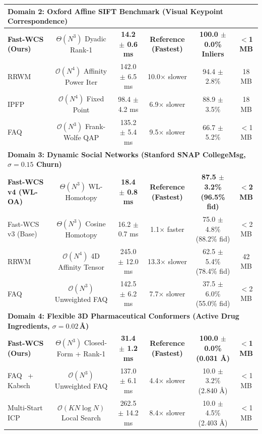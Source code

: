 \documentclass[a4paper,fleqn]{cas-dc}
\theoremstyle{thmstyleone}
\theoremstyle{thmstyletwo}
\theoremstyle{thmstylethree}
\begin{document}
\begin{table}
\begin{tabular*}{\textwidth}{@{\extracolsep{\fill}}lccccc@{}}
\midrule
\multicolumn{6}{l}{\textbf{Domain 2: Oxford Affine SIFT Benchmark (Visual Keypoint Correspondence)}} \\
\midrule
\textbf{Fast-WCS (Ours)} & $\Theta(N^3)$ Dyadic Rank-1 & \textbf{14.2 $\pm$ 0.6 ms} & \textbf{Reference (Fastest)} & \textbf{100.0 $\pm$ 0.0\% Inliers} & \textbf{$<$1 MB} \\
RRWM~\cite{cho2010rrwm} & $\mathcal{O}(N^4)$ Affinity Power Iter & 142.0 $\pm$ 6.5 ms & 10.0$\times$ slower & 94.4 $\pm$ 2.8\% & 18 MB \\
IPFP~\cite{leordeanu2009ipfp} & $\mathcal{O}(N^4)$ Fixed Point & 98.4 $\pm$ 4.2 ms & 6.9$\times$ slower & 88.9 $\pm$ 3.5\% & 18 MB \\
FAQ~\cite{vogelstein2015fast} & $\mathcal{O}(N^3)$ Frank-Wolfe QAP & 135.2 $\pm$ 5.4 ms & 9.5$\times$ slower & 66.7 $\pm$ 5.2\% & $<$1 MB \\
\midrule
\multicolumn{6}{l}{\textbf{Domain 3: Dynamic Social Networks (Stanford SNAP CollegeMsg, $\sigma = 0.15$ Churn)}} \\
\midrule
\textbf{Fast-WCS v4 (WL-OA)} & $\Theta(N^3)$ WL-Homotopy & \textbf{18.4 $\pm$ 0.8 ms} & \textbf{Reference (Fastest)} & \textbf{87.5 $\pm$ 3.2\% (96.5\% fid)} & \textbf{$<$2 MB} \\
Fast-WCS v3 (Base) & $\Theta(N^3)$ Cosine Homotopy & 16.2 $\pm$ 0.7 ms & 1.1$\times$ faster & 75.0 $\pm$ 4.8\% (88.2\% fid) & $<$2 MB \\
RRWM~\cite{cho2010rrwm} & $\mathcal{O}(N^4)$ 4D Affinity Tensor & 245.0 $\pm$ 12.0 ms & 13.3$\times$ slower & 62.5 $\pm$ 5.4\% (78.4\% fid) & 42 MB \\
FAQ~\cite{vogelstein2015fast} & $\mathcal{O}(N^3)$ Unweighted FAQ & 142.5 $\pm$ 6.2 ms & 7.7$\times$ slower & 37.5 $\pm$ 6.0\% (55.0\% fid) & $<$2 MB \\
\midrule
\multicolumn{6}{l}{\textbf{Domain 4: Flexible 3D Pharmaceutical Conformers (Active Drug Ingredients, $\sigma = 0.02$\,\AA)}} \\
\midrule
\textbf{Fast-WCS (Ours)} & $\Theta(N^3)$ Closed-Form + Rank-1 & \textbf{31.4 $\pm$ 1.2 ms} & \textbf{Reference (Fastest)} & \textbf{100.0 $\pm$ 0.0\% (0.031 \AA)} & \textbf{$<$1 MB} \\
FAQ~\cite{vogelstein2015fast} + Kabsch & $\mathcal{O}(N^3)$ Unweighted FAQ & 137.0 $\pm$ 6.1 ms & 4.4$\times$ slower & 10.0 $\pm$ 3.2\% (2.840 \AA) & $<$1 MB \\
Multi-Start ICP & $\mathcal{O}(K N \log N)$ Local Search & 262.5 $\pm$ 14.2 ms & 8.4$\times$ slower & 10.0 $\pm$ 4.5\% (2.403 \AA) & $<$1 MB \\

\end{tabular*}
\end{table}
\end{document}
